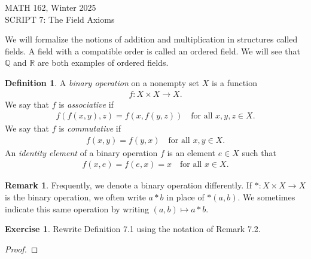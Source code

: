 \documentclass[11pt]{article}
\newcommand{\bbQ}{\mathbb{Q}}
\newcommand{\bbR}{\mathbb{R}}
\newcommand{\arr}{\longrightarrow}
\theoremstyle{definition}
\newtheorem{definition}[theorem]{Definition}
\newtheorem{exercise}[theorem]{Exercise}
\newtheorem{remark}[theorem]{Remark}
\newcommand{\head}[1]{
	\begin{center}
		{\large #1}
		\vspace{.2 in}
	\end{center}
	
	\bigskip
}
\numberwithin{equation}{subsection}
\begin{document}
\head{MATH 162, Winter 2025\\
SCRIPT 7: The Field Axioms} 



\setcounter{section}{7}   

We will formalize the notions of addition and multiplication in structures called fields.  A field with a compatible order is called an ordered field. We will see that $\bbQ$ and $\bbR$ are both examples of ordered fields.

\begin{definition} 
	A \emph{binary operation} on a nonempty set $X$ is a function 
	\begin{align*}
		f \colon X \times X \arr X.
	\end{align*}
	We say that $f$ is \emph{associative} if
	\begin{align*}
		f(f(x, y), z) = f(x, f(y, z)) \quad \text{for all $x, y, z \in X$.}
	\end{align*}
	We say that $f$ is \emph{commutative} if
	\begin{align*}
		f(x, y) = f(y, x) \quad \text{for all $x, y \in X$.}
	\end{align*}
	An \emph{identity element} of a binary operation $f$ is an element $e \in X$ such that
	\begin{align*}
		f(x, e) = f(e, x) = x \quad \text{for all $x \in X$.}
	\end{align*}
\end{definition}

\begin{remark}
	Frequently, we denote a binary operation differently. If $*\colon X\times X\arr X$ is the binary operation, we often write $a*b$ in place of $*(a,b)$. We sometimes indicate this same operation by writing $(a,b)\mapsto a*b$.
\end{remark}

\begin{exercise}
	Rewrite Definition 7.1 using the notation of Remark 7.2.
\begin{proof}


\renewcommand\qedsymbol{QED}
\end{proof}
\end{exercise}
\end{document}
